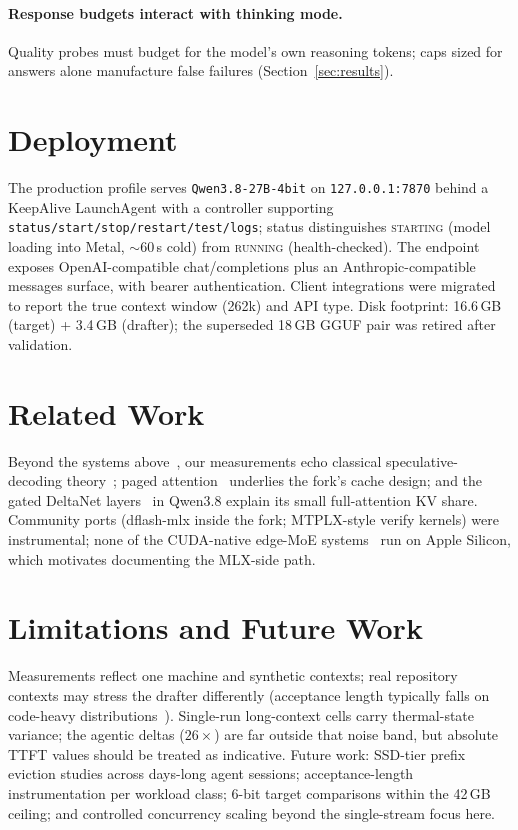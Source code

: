 \documentclass[11pt]{article}
\begin{document}
\paragraph{Response budgets interact with thinking mode.} Quality probes must
budget for the model's own reasoning tokens; caps sized for answers alone
manufacture false failures (Section~\ref{sec:results}).

\section{Deployment}
\label{sec:deployment}
The production profile serves \texttt{Qwen3.8-27B-4bit} on
\texttt{127.0.0.1:7870} behind a KeepAlive LaunchAgent with a controller
supporting \texttt{status/start/stop/restart/test/logs}; status distinguishes
\textsc{starting} (model loading into Metal, ${\sim}60$\,s cold) from
\textsc{running} (health-checked). The endpoint exposes OpenAI-compatible
chat/completions plus an Anthropic-compatible messages surface, with bearer
authentication. Client integrations were migrated to report the true context
window (262k) and API type. Disk footprint: 16.6\,GB (target) + 3.4\,GB
(drafter); the superseded 18\,GB GGUF pair was retired after validation.

\section{Related Work}
Beyond the systems above~\cite{dflash,dflash2card,freetoken,omlx,qwen38}, our
measurements echo classical speculative-decoding theory~\cite{leviathan2023fast};
paged attention~\cite{pagedattention} underlies the fork's cache design; and the
gated DeltaNet layers~\cite{gdn} in Qwen3.8 explain its small full-attention KV
share. Community ports (dflash-mlx inside the fork; MTPLX-style verify kernels)
were instrumental; none of the CUDA-native edge-MoE systems~\cite{freetoken}
run on Apple Silicon, which motivates documenting the MLX-side path.

\section{Limitations and Future Work}
Measurements reflect one machine and synthetic contexts; real repository
contexts may stress the drafter differently (acceptance length typically falls
on code-heavy distributions~\cite{dflash2card}). Single-run long-context cells
carry thermal-state variance; the agentic deltas ($26\times$) are far outside
that noise band, but absolute TTFT values should be treated as indicative.
Future work: SSD-tier prefix eviction studies across days-long agent sessions;
acceptance-length instrumentation per workload class; 6-bit target comparisons
within the 42\,GB ceiling; and controlled concurrency scaling beyond the
single-stream focus here.
\end{document}
